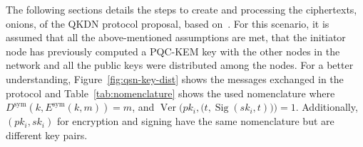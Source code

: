 \documentclass[conference]{IEEEtran}
\begin{document}
The following sections details the steps to create and processing the ciphertexts, onions, of the QKDN protocol proposal, based on~\cite{kuhn2021onion}. For this scenario, it is assumed that all the above-mentioned assumptions are met, that the initiator node has previously computed a PQC-KEM key with the other nodes in the network and all the public keys were distributed among the nodes. For a better understanding,  Figure~\ref{fig:qsn-key-dist} shows the messages exchanged in the protocol and Table~\ref{tab:nomenclature} shows the used nomenclature where $D^{\text{sym}}(k, E^{\text{sym}}(k, m)) = m$, and $\operatorname{Ver}\bigl(pk_i,\bigl(t, \operatorname{Sig}(sk_i,t)\bigr)\bigr)= 1$. Additionally, $(pk_i,sk_i)$ for encryption and signing have the same nomenclature but are different key pairs.
\end{document}

